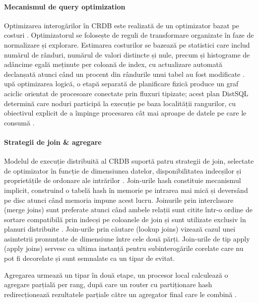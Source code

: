 \paragraph{Mecanismul de query optimization}

Optimizarea interogărilor în CRDB este realizată de un optimizator bazat pe costuri \cite{crdb_cbo}. Optimizatorul se folosește de reguli de transformare organizate în faze de normalizare și explorare. Estimarea costurilor se bazează pe statistici care includ numărul de rânduri, numărul de valori distincte și nule, precum și histograme de adâncime egală meținute per coloană de index, cu actualizare automată declanșată atunci când un procent din rândurile unui tabel au fost modificate \cite{crdb_cbo}. upă optimizarea logică, o etapă separată de planificare fizică produce un graf aciclic orientat de procesoare conectate prin fluxuri tipizate; acest plan DistSQL determină care noduri participă la execuție pe baza localității rangurilor, cu obiectivul explicit de a împinge procesarea cât mai aproape de datele pe care le consumă \cite{rfc-distributed-sql-cockroach}.

\paragraph{Strategii de join \& agregare}

Modelul de execuție distribuită al CRDB suportă patru strategii de join, selectate de optimizator în funcție de dimensiunea datelor, disponibilitatea indecșilor și proprietățile de ordonare ale intrărilor \cite{crdb_join}. Join-urile hash constituie mecanismul implicit, construind o tabelă hash în memorie pe intrarea mai mică și deversând pe disc atunci când memoria impune acest lucru. Joinurile prin interclasare (merge joins) sunt preferate atunci când ambele relații sunt citite într-o ordine de sortare compatibilă prin indecși pe coloanele de join și sunt utilizate exclusiv în planuri distribuite \cite{crdb_join}. Join-urile prin căutare (lookup joins) vizează cazul unei asimtetrii pronunțate de dimensiune între cele două părți. Join-urile de tip apply (apply joins) servesc ca ultima instanță pentru subinterogările corelate care nu pot fi decorelate și sunt semnalate ca un tipar de evitat.

Agregarea urmează un tipar în două etape, un procesor local calculează o agregare parțială per rang, după care un router cu partiționare hash redirecționează rezultatele parțiale către un agregator final care le combină \cite{rfc-distributed-sql-cockroach}.

